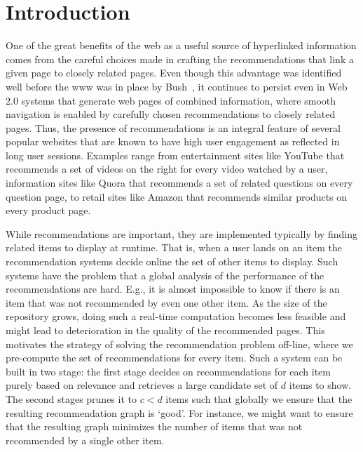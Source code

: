 \begin{abstract}
\iffalse
In this paper, we study the problem of graph recommendations as
variants of bipartite matching problems. We consider the problem
of solving such matching problems in practice at web-scale. To achieve
this we introduce several models to simulate underlying input graph
structures. We then analyze the conditions under which a random sample
of edges using constant memory already suffices to be a
'good' recommendation algorithm as opposed the cases when we may consider
the more classical and involved linear memory polynomial time algorithms.
We also show how to select the number of recommendations per item while
building a website so that there exists a 'perfect' graph recommendation.
\fi

\end{abstract}

\section{Introduction}

One of the great benefits of the web as a useful source of hyperlinked
information comes from the careful choices made in crafting the recommendations
that link a given page to closely related pages. Even though this advantage was
identified well before the www was in place by Bush~\cite{Bush45}, it continues
to persist even in Web 2.0 systems that generate web pages of combined
information, where smooth navigation is enabled by carefully chosen
recommendations to closely related pages. Thus, the presence of recommendations
is an integral feature of several popular websites that are known to have high
user engagement as reflected in long user sessions. Examples range from 
entertainment sites like YouTube that recommends a set of videos on the right
for every video watched by a user, information sites like Quora that recommends
a set of related questions on every question page, to retail sites like Amazon
that recommends similar products on every product page. \vs

While recommendations are important, they are implemented typically by finding
related items to display at runtime. That is, when a user lands on an item the
recommendation systems decide online the set of other items to display. Such
systems have the problem that a global analysis of the performance of the
recommendations are hard. E.g., it is almost impossible to know if there is an
item that was not recommended by even one other item. As the size of the
repository grows, doing such a real-time computation becomes less feasible and
might lead to deterioration in the quality of the recommended pages.  This
motivates the strategy of solving the recommendation problem off-line, where we
pre-compute the set of recommendations for every item. Such a system can be
built in two stage: the first stage decides on recommendations for each item
purely based on relevance and retrieves a large candidate set of $d$ items to
show. The second stages prunes it to $c < d$ items such that globally we ensure
that the resulting recommendation graph is `good'. For instance, we might want
to ensure that the resulting graph minimizes the number of items that was not
recommended by a single other item. \vs

